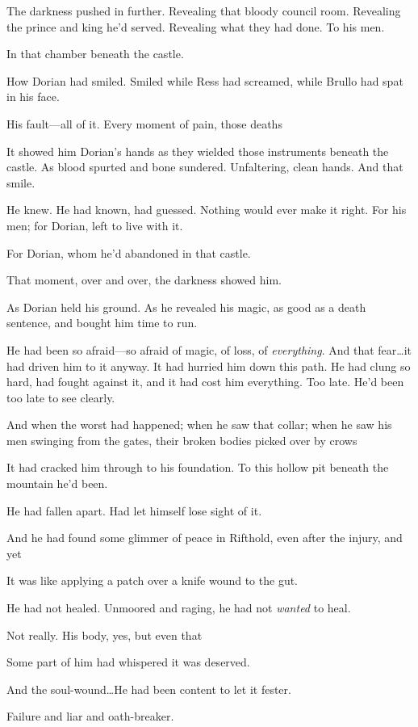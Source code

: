 The darkness pushed in further.
Revealing that bloody council room.
Revealing the prince and king he'd served.
Revealing what they had done.
To his men.

In that chamber beneath the castle.

How Dorian had smiled.
Smiled while Ress had screamed, while Brullo had spat in his face.

His fault---all of it.
Every moment of pain, those deaths 

It showed him Dorian's hands as they wielded those instruments beneath the castle.
As blood spurted and bone sundered.
Unfaltering, clean hands.
And that smile.

He knew.
He had known, had guessed.
Nothing would ever make it right.
For his men; for Dorian, left to live with it.

For Dorian, whom he'd abandoned in that castle.

That moment, over and over, the darkness showed him.

As Dorian held his ground.
As he revealed his magic, as good as a death sentence, and bought him time to run.

He had been so afraid---so afraid of magic, of loss, of \emph{everything}.
And that fear\ldots it had driven him to it anyway.
It had hurried him down this path.
He had clung so hard, had fought against it, and it had cost him everything.
Too late.
He'd been too late to see clearly.

And when the worst had happened; when he saw that collar; when he saw his men swinging from the gates, their broken bodies picked over by crows 

It had cracked him through to his foundation.
To this hollow pit beneath the mountain he'd been.

He had fallen apart.
Had let himself lose sight of it.

And he had found some glimmer of peace in Rifthold, even after the injury, and yet 

It was like applying a patch over a knife wound to the gut.

He had not healed.
Unmoored and raging, he had not \emph{wanted} to heal.

Not really.
His body, yes, but even that 

Some part of him had whispered it was deserved.

And the soul-wound\ldots He had been content to let it fester.

Failure and liar and oath-breaker.

